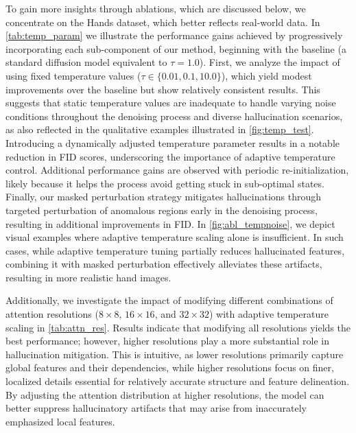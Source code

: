 To gain more insights through ablations, which are discussed below, we concentrate on the Hands dataset, which better reflects real-world data.
In \cref{tab:temp_param} we illustrate the performance gains achieved by progressively incorporating each sub-component of our method, beginning with the baseline (a standard diffusion model equivalent to $\tau=1.0$).
First, we analyze the impact of using fixed temperature values ($\tau \in \{0.01, 0.1, 10.0\}$), which yield modest improvements over the baseline but show relatively consistent results.
This suggests that static temperature values are inadequate to handle varying noise conditions throughout the denoising process and diverse hallucination scenarios, as also reflected in the qualitative examples illustrated in \cref{fig:temp_test}.
Introducing a dynamically adjusted temperature parameter results in a notable reduction in FID scores, underscoring the importance of adaptive temperature control.
Additional performance gains are observed with periodic re-initialization, likely because it helps the process avoid getting stuck in sub-optimal states.
Finally, our masked perturbation strategy mitigates hallucinations through targeted perturbation of anomalous regions early in the denoising process, resulting in additional improvements in FID. 
In \cref{fig:abl_tempnoise}, we depict visual examples where adaptive temperature scaling alone is insufficient. 
In such cases, while adaptive temperature tuning partially reduces hallucinated features, combining it with masked perturbation effectively alleviates these artifacts, resulting in more realistic hand images. 

Additionally, we investigate the impact of modifying different combinations of attention resolutions ($8\times8$, $16\times16$, and $32\times32$) with adaptive temperature scaling in \cref{tab:attn_res}. 
Results indicate that modifying all resolutions yields the best performance; however, higher resolutions play a more substantial role in hallucination mitigation. 
This is intuitive, as lower resolutions primarily capture global features and their dependencies, while higher resolutions focus on finer, localized details essential for relatively accurate structure and feature delineation. 
By adjusting the attention distribution at higher resolutions, the model can better suppress hallucinatory artifacts that may arise from inaccurately emphasized local features.


